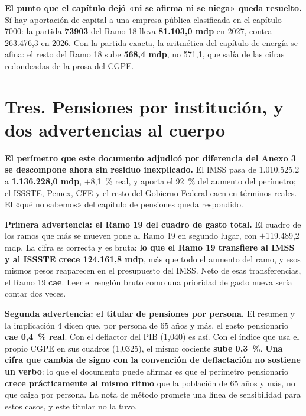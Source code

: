 
\textbf{El punto que el capítulo dejó «ni se afirma ni se niega» queda resuelto.} Sí hay
aportación de capital a una empresa pública clasificada en el capítulo 7000: la partida
\textbf{73903} del Ramo 18 lleva \textbf{81.103,0 mdp} en 2027, contra 263.476,3 en 2026. Con
la partida exacta, la aritmética del capítulo de energía se afina: el resto del Ramo 18 sube
\textbf{568,4 mdp}, no 571,1, que salía de las cifras redondeadas de la prosa del CGPE.

\section*{Tres. Pensiones por institución, y dos advertencias al cuerpo}



\textbf{El perímetro que este documento adjudicó por diferencia del Anexo 3 se descompone
ahora sin residuo inexplicado.} El IMSS pasa de 1.010.525,2 a \textbf{1.136.228,0 mdp},
$+$8,1~\% real, y aporta el 92~\% del aumento del perímetro; el ISSSTE, Pemex, CFE y el resto
del Gobierno Federal caen en términos reales. El «qué no sabemos» del capítulo de pensiones
queda respondido.

\textbf{Primera advertencia: el Ramo 19 del cuadro de gasto total.} El cuadro de los ramos
que más se mueven pone al Ramo 19 en segundo lugar, con $+$119.489,2 mdp. La cifra es
correcta y es bruta: \textbf{lo que el Ramo 19 transfiere al IMSS y al ISSSTE crece
124.161,8 mdp}, más que todo el aumento del ramo, y esos mismos pesos reaparecen en el
presupuesto del IMSS. Neto de esas transferencias, el Ramo 19 \textbf{cae}. Leer el renglón
bruto como una prioridad de gasto nueva sería contar dos veces.

\textbf{Segunda advertencia: el titular de pensiones por persona.} El resumen y la
implicación 4 dicen que, por persona de 65 años y más, el gasto pensionario \textbf{cae
0,4~\% real}. Con el deflactor del PIB (1,040) es así. Con el índice que usa el propio CGPE
en sus cuadros (1,0325), el mismo cociente \textbf{sube 0,3~\%}. \textbf{Una cifra que cambia
de signo con la convención de deflactación no sostiene un verbo}: lo que el documento puede
afirmar es que el perímetro pensionario \textbf{crece prácticamente al mismo ritmo} que la
población de 65 años y más, no que caiga por persona. La nota de método promete una línea de
sensibilidad para estos casos, y este titular no la tuvo.

